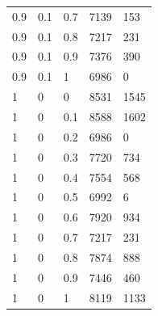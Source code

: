\documentclass[12pt,a4paper]{report}
\begin{document}
\begin{table}[ht!]
\begin{tabular}{ | l | l | l | l | l |}
		0.9      & 0.1     & 0.7 & 7139      & 153     \\
		0.9      & 0.1     & 0.8 & 7217      & 231     \\
		0.9      & 0.1     & 0.9 & 7376      & 390     \\
		0.9      & 0.1     & 1   & 6986      & 0       \\
		1        & 0       & 0   & 8531      & 1545    \\
		1        & 0       & 0.1 & 8588      & 1602    \\
		1        & 0       & 0.2 & 6986      & 0       \\
		1        & 0       & 0.3 & 7720      & 734     \\
		1        & 0       & 0.4 & 7554      & 568     \\
		1        & 0       & 0.5 & 6992      & 6       \\
		1        & 0       & 0.6 & 7920      & 934     \\
		1        & 0       & 0.7 & 7217      & 231     \\
		1        & 0       & 0.8 & 7874      & 888     \\
		1        & 0       & 0.9 & 7446      & 460     \\
		1        & 0       & 1   & 8119      & 1133    \\
		\hline
	\end{tabular}
\end{table}
\end{document}
